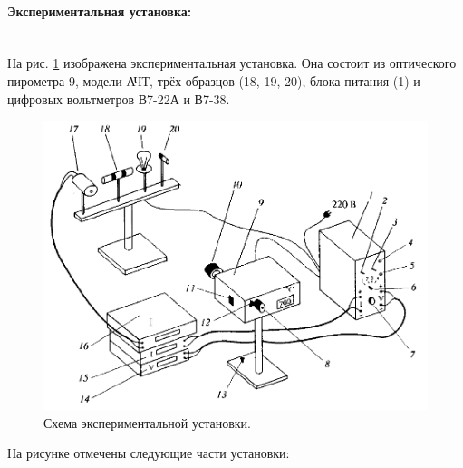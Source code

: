 \documentclass[a4paper, 12pt]{article}
\newcommand{\parag}[1]{\paragraph*{#1:}}
\begin{document}
\parag {Экспериментальная установка}~\\
На рис. \ref{pic:work} изображена экспериментальная установка. Она состоит из оптического пирометра 9, модели АЧТ, трёх образцов (18, 19, 20), блока питания (1) и цифровых вольтметров В7-22А и В7-38.

\begin{figure}[H]
    \includegraphics[scale = 0.4]{setup}
    \centering
    \caption{Схема экспериментальной установки.}
    \label{pic:work}
\end{figure}

На рисунке отмечены следующие части установки:
\end{document}
